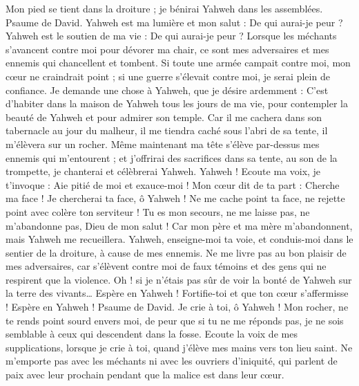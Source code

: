 \begin{multicols}{2}
Mon pied se tient dans la droiture ; je bénirai Yahweh dans les assemblées.
\VerseOne{}Psaume de David. Yahweh est ma lumière et mon salut : De qui aurai-je peur ? Yahweh est le soutien de ma vie : De qui aurai-je peur ?
Lorsque les méchants s’avancent contre moi pour dévorer ma chair, ce sont mes adversaires et mes ennemis qui chancellent et tombent.
Si toute une armée campait contre moi, mon cœur ne craindrait point ; si une guerre s’élevait contre moi, je serai plein de confiance.
Je demande une chose à Yahweh, que je désire ardemment : C'est d’habiter dans la maison de Yahweh tous les jours de ma vie, pour contempler la beauté de Yahweh et pour admirer son temple.
Car il me cachera dans son tabernacle au jour du malheur, il me tiendra caché sous l’abri de sa tente, il m'élèvera sur un rocher.
Même maintenant ma tête s'élève par-dessus mes ennemis qui m’entourent ; et j’offrirai des sacrifices dans sa tente, au son de la trompette, je chanterai et célèbrerai Yahweh.
Yahweh ! Ecoute ma voix, je t'invoque : Aie pitié de moi et exauce-moi !
Mon cœur dit de ta part : Cherche ma face ! Je chercherai ta face, ô Yahweh !
Ne me cache point ta face, ne rejette point avec colère ton serviteur ! Tu es mon secours, ne me laisse pas, ne m'abandonne pas, Dieu de mon salut !
Car mon père et ma mère m'abandonnent, mais Yahweh me recueillera.
Yahweh, enseigne-moi ta voie, et conduis-moi dans le sentier de la droiture, à cause de mes ennemis.
Ne me livre pas au bon plaisir de mes adversaires, car s’élèvent contre moi de faux témoins et des gens qui ne respirent que la violence.
Oh ! si je n’étais pas sûr de voir la bonté de Yahweh sur la terre des vivants…
Espère en Yahweh ! Fortifie-toi et que ton cœur s’affermisse ! Espère en Yahweh !
\VerseOne{}Psaume de David. Je crie à toi, ô Yahweh ! Mon rocher, ne te rends point sourd envers moi, de peur que si tu ne me réponds pas, je ne sois semblable à ceux qui descendent dans la fosse.
Ecoute la voix de mes supplications, lorsque je crie à toi, quand j'élève mes mains vers ton lieu saint.
Ne m’emporte pas avec les méchants ni avec les ouvriers d'iniquité, qui parlent de paix avec leur prochain pendant que la malice est dans leur cœur.

\end{multicols}
